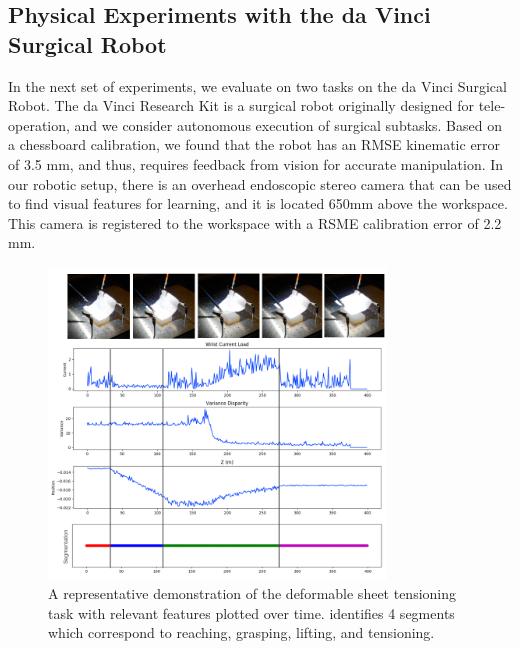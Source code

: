 \subsection{Physical Experiments with the da Vinci Surgical Robot}
In the next set of experiments, we evaluate \hirl on two tasks on the da Vinci Surgical Robot.
The da Vinci Research Kit is a surgical robot originally designed for tele-operation, and we consider autonomous execution of surgical subtasks.
Based on a chessboard calibration, we found that the robot has an RMSE kinematic error of 3.5 mm, and thus, requires feedback from vision for accurate manipulation. 
In our robotic setup, there is an overhead endoscopic stereo camera that can be used to find visual features for learning, and it is located 650mm above the workspace.
This camera is registered to the workspace with a RSME calibration error of 2.2 mm.

\begin{figure}[t]
\centering
    \includegraphics[width=0.8\textwidth]{exp/signals2.png}
    \caption{A representative demonstration of the deformable sheet tensioning task with relevant features plotted over time. \hirl identifies 4 segments which correspond to reaching, grasping, lifting, and tensioning. 
    }
    \label{exp:dvrk3}
\end{figure}


